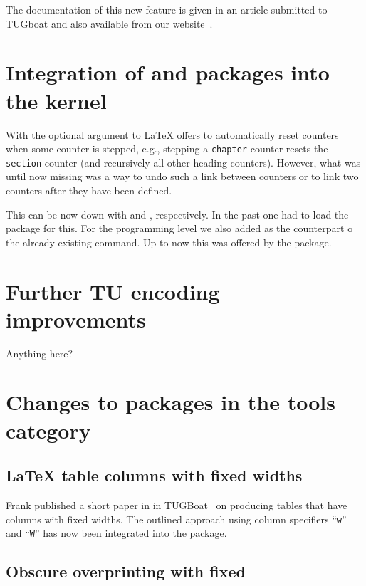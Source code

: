 \documentclass{ltnews}
\begin{document}
  The documentation of this new feature is given in an article
  submitted to TUGboat and also available from our
  website~\cite{Mittelbach:TB39-2}.


\section{Integration of  and  packages 
         into the kernel}

With the optional argument to  \LaTeX{} offers to
automatically reset counters when some counter is stepped, e.g.,
stepping a \texttt{chapter} counter resets the \texttt{section}
counter (and recursively all other heading counters). However, what
was until now missing was a way to undo such a link between counters
or to link two counters after they have been defined.

This can be now down with  and ,
respectively. In the past one had to load the  package
for this. For the programming level we also added
 as the counterpart o the already existing
 command. Up to now this was offered by the
 package.



\section{Further TU encoding improvements}

Anything here?

\section{Changes to packages in the tools category}

\subsection{\LaTeX{} table columns with fixed widths}

Frank published a short paper in in
TUGBoat~\cite{Mittelbach:TB38-2-213} on producing tables that have
columns with fixed widths. The outlined approach using column
specifiers ``\texttt{w}'' and ``\texttt{W}'' has now been integrated
into the  package.

\subsection{Obscure overprinting with  fixed}
\end{document}
